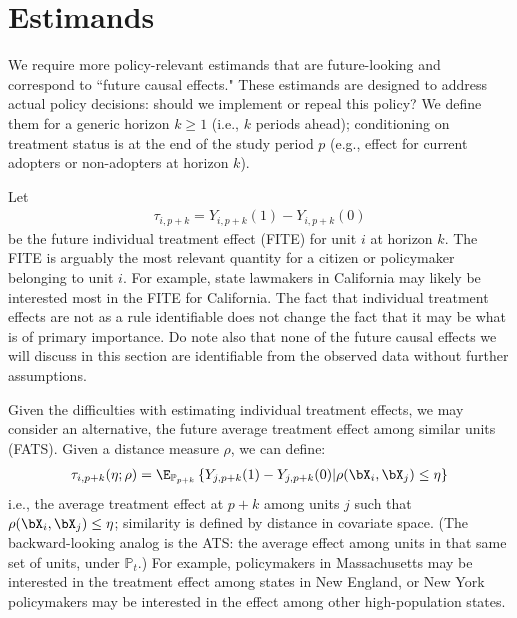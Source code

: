 \documentclass{article}
\renewcommand{\P}{\mathbb{P}}
\begin{document}

\section{Estimands}
We require more policy-relevant estimands that are future-looking and correspond to ``future causal effects." These estimands are designed to address actual policy decisions: should we implement or repeal this policy? We define them for a generic horizon $k \geq 1$ (i.e., $k$ periods ahead); conditioning on treatment status is at the end of the study period $p$ (e.g., effect for current adopters or non-adopters at horizon $k$).

Let 
\begin{align*}
    \tau_{i,p+k} = Y_{i,p+k}(1) - Y_{i,p+k}(0)
\end{align*} 
be the future individual treatment effect (FITE) for unit $i$ at horizon $k$. The FITE is arguably the most relevant quantity for a citizen or policymaker belonging to unit $i$. For example, state lawmakers in California may likely be interested most in the FITE for California. The fact that individual treatment effects are not as a rule identifiable does not change the fact that it may be what is of primary importance. Do note also that none of the future causal effects we will discuss in this section are identifiable from the observed data without further assumptions. 

Given the difficulties with estimating individual treatment effects, we may consider an alternative, the future average treatment effect among similar units (FATS). Given a distance measure $\rho$, we can define:
\begin{align*}
    \tau_{i,p+k}(\eta; \rho) = \E_{\P_{p+k}}\left\{Y_{j,p+k}(1) - Y_{j,p+k}(0) | \rho(\bX_i, \bX_j) \leq \eta \right\}
\end{align*} 
i.e., the average treatment effect at $p+k$ among units $j$ such that $\rho(\bX_i, \bX_j) \leq \eta$; similarity is defined by distance in covariate space. (The backward-looking analog is the ATS: the average effect among units in that same set of units, under $\P_t$.) For example, policymakers in Massachusetts may be interested in the treatment effect among states in New England, or New York policymakers may be interested in the effect among other high-population states.
\end{document}
